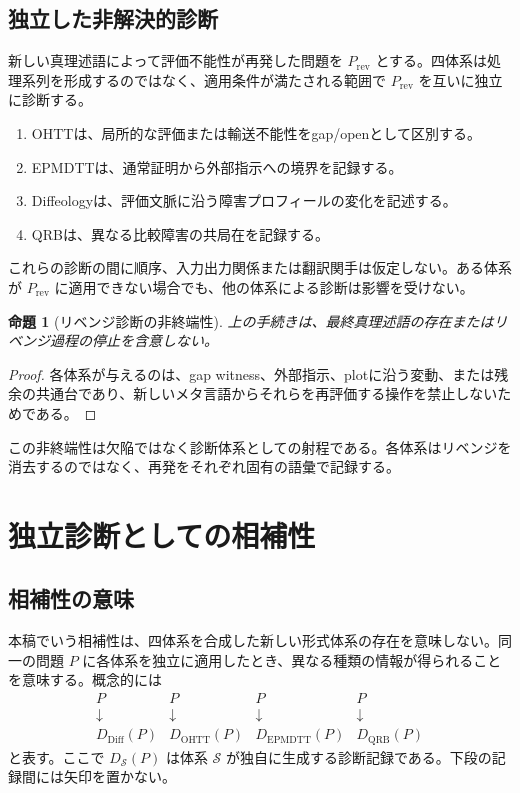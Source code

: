 \documentclass[a4paper,11pt]{ltjsarticle}
\theoremstyle{definition}
\theoremstyle{plain}
\newtheorem{proposition}[definition]{命題}
\newcommand{\QRB}{\mathrm{QRB}}
\newcommand{\OHTT}{\mathrm{OHTT}}
\newcommand{\EPMDTT}{\mathrm{EPMDTT}}
\begin{document}
\subsection{独立した非解決的診断}

新しい真理述語によって評価不能性が再発した問題を $P_{\mathrm{rev}}$ とする。四体系は処理系列を形成するのではなく、適用条件が満たされる範囲で $P_{\mathrm{rev}}$ を互いに独立に診断する。
\begin{enumerate}
 \item OHTTは、局所的な評価または輸送不能性をgap/openとして区別する。
 \item EPMDTTは、通常証明から外部指示への境界を記録する。
 \item Diffeologyは、評価文脈に沿う障害プロフィールの変化を記述する。
 \item QRBは、異なる比較障害の共局在を記録する。
\end{enumerate}

これらの診断の間に順序、入力出力関係または翻訳関手は仮定しない。ある体系が $P_{\mathrm{rev}}$ に適用できない場合でも、他の体系による診断は影響を受けない。

\begin{proposition}[リベンジ診断の非終端性]
上の手続きは、最終真理述語の存在またはリベンジ過程の停止を含意しない。
\end{proposition}

\begin{proof}
各体系が与えるのは、gap witness、外部指示、plotに沿う変動、または残余の共通台であり、新しいメタ言語からそれらを再評価する操作を禁止しないためである。
\end{proof}

この非終端性は欠陥ではなく診断体系としての射程である。各体系はリベンジを消去するのではなく、再発をそれぞれ固有の語彙で記録する。

\section{独立診断としての相補性}\label{sec:complementary}

\subsection{相補性の意味}

本稿でいう相補性は、四体系を合成した新しい形式体系の存在を意味しない。同一の問題 $P$ に各体系を独立に適用したとき、異なる種類の情報が得られることを意味する。概念的には
\begin{equation}
 \begin{array}{cccc}
 P & P & P & P \\
 \downarrow & \downarrow & \downarrow & \downarrow \\
 D_{\mathrm{Diff}}(P)
 & D_{\OHTT}(P)
 & D_{\EPMDTT}(P)
 & D_{\QRB}(P)
 \end{array}
 \label{eq:independent-complementarity}
\end{equation}
と表す。ここで $D_{\mathcal S}(P)$ は体系 $\mathcal S$ が独自に生成する診断記録である。下段の記録間には矢印を置かない。
\end{document}
